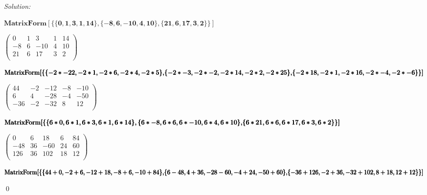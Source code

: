 \documentclass[12pt]{article}
\newenvironment{sol}
    {\emph{Solution:}
    }
    {
    \qed
    }
\begin{document}
\begin{sol}
\begin{doublespace}
\noindent\(\pmb{\text{MatrixForm}[\{\{0,1,3,1,14\},\{-8,6,-10,4,10\},\{21,6,17,3,2\}\}]}\)
\end{doublespace}

\begin{doublespace}
\noindent\(\left(
\begin{array}{ccccc}
 0 & 1 & 3 & 1 & 14 \\
 -8 & 6 & -10 & 4 & 10 \\
 21 & 6 & 17 & 3 & 2 \\
\end{array}
\right)\)
\end{doublespace}

\begin{doublespace}
\noindent\(\pmb{\text{MatrixForm}[\{\{-2*-22,-2*1,-2*6,-2*4,-2*5\},}\\
\pmb{\{-2*-3,-2*-2,-2*14,-2*2,-2*25\},}\\
\pmb{\{-2*18,-2*1,-2*16,-2*-4,-2*-6\}\}]}\)
\end{doublespace}

\begin{doublespace}
\noindent\(\left(
\begin{array}{ccccc}
 44 & -2 & -12 & -8 & -10 \\
 6 & 4 & -28 & -4 & -50 \\
 -36 & -2 & -32 & 8 & 12 \\
\end{array}
\right)\)
\end{doublespace}

\begin{doublespace}
\noindent\(\pmb{\text{MatrixForm}[\{\{6*0,6*1,6*3,6*1,6*14\},\{6*-8,6*6,6*-10,6*4,6*10\},}\\
\pmb{\{6*21,6*6,6*17,6*3,6*2\}\}]}\)
\end{doublespace}

\begin{doublespace}
\noindent\(\left(
\begin{array}{ccccc}
 0 & 6 & 18 & 6 & 84 \\
 -48 & 36 & -60 & 24 & 60 \\
 126 & 36 & 102 & 18 & 12 \\
\end{array}
\right)\)
\end{doublespace}

\begin{doublespace}
\noindent\(\pmb{\text{MatrixForm}[\{\{44+0,-2+6,-12+18,-8+6,-10+84\},}\\
\pmb{\{6-48,4+36,-28-60,-4+24,-50+60\},}\\
\pmb{\{-36+126,-2+36,-32+102,8+18,12+12\}\}]}\)
\end{doublespace}


\end{sol}
\end{document}
